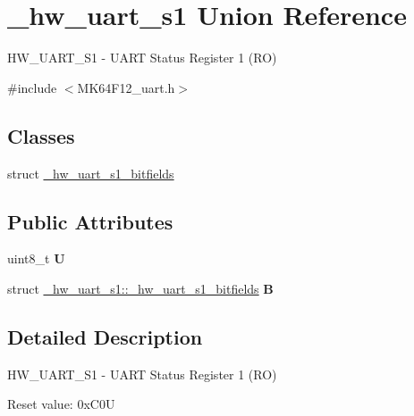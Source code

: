 \hypertarget{union__hw__uart__s1}{}\section{\+\_\+hw\+\_\+uart\+\_\+s1 Union Reference}
\label{union__hw__uart__s1}


H\+W\+\_\+\+U\+A\+R\+T\+\_\+\+S1 -\/ U\+A\+RT Status Register 1 (RO)  




{\ttfamily \#include $<$M\+K64\+F12\+\_\+uart.\+h$>$}

\subsection*{Classes}
\begin{DoxyCompactItemize}
\item 
struct \hyperlink{struct__hw__uart__s1_1_1__hw__uart__s1__bitfields}{\+\_\+hw\+\_\+uart\+\_\+s1\+\_\+bitfields}
\end{DoxyCompactItemize}
\subsection*{Public Attributes}
\begin{DoxyCompactItemize}
\item 
uint8\+\_\+t {\bfseries U}\hypertarget{union__hw__uart__s1_a27a127413260b46e450390b76dc347b1}{}\label{union__hw__uart__s1_a27a127413260b46e450390b76dc347b1}

\item 
struct \hyperlink{struct__hw__uart__s1_1_1__hw__uart__s1__bitfields}{\+\_\+hw\+\_\+uart\+\_\+s1\+::\+\_\+hw\+\_\+uart\+\_\+s1\+\_\+bitfields} {\bfseries B}\hypertarget{union__hw__uart__s1_a2f1648ac149afa7c65c440ddfbf6c243}{}\label{union__hw__uart__s1_a2f1648ac149afa7c65c440ddfbf6c243}

\end{DoxyCompactItemize}


\subsection{Detailed Description}
H\+W\+\_\+\+U\+A\+R\+T\+\_\+\+S1 -\/ U\+A\+RT Status Register 1 (RO) 

Reset value\+: 0x\+C0U

